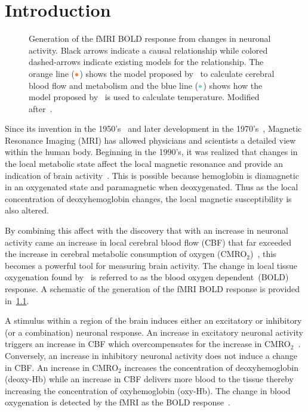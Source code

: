 \chapter{Introduction}
\label{ch:introduction}

\begin{figure}[tb]
  \centering
  \vspace{10pt}
  
  \caption[Generation of the fMRI BOLD response and a corresponding temperature change]{\label{fig:flowchart} Generation of the fMRI BOLD response from changes in neuronal activity.  Black arrows indicate a causal relationship while colored dashed-arrows indicate existing models for the relationship.  The orange line ($\color{goldfish}\bullet$) shows the model proposed by~\citet{sotero2011} to calculate cerebral blood flow and metabolism and the blue line ($\color{aoi}\bullet$) shows how the model proposed by~\citet{collins} is used to calculate temperature.  Modified after~\citet{sotero2007}.}
\end{figure}

Since its invention in the 1950's~\citep{carr1954} and later development in the 1970's~\citep{lauterbur1973}, {M}agnetic {R}esonance {I}maging ({MRI}) has allowed physicians and scientists a detailed view within the human body.  Beginning in the 1990's, it was realized that changes in the local metabolic state affect the local magnetic resonance and provide an indication of brain activity~\citep{ogawa1990,kwong1992}.  This is possible because hemoglobin is diamagnetic in an oxygenated state and paramagnetic when deoxygenated.  Thus as the local concentration of deoxyhemoglobin changes, the local magnetic susceptibility is also altered.  

By combining this affect with the discovery that with an increase in neuronal activity came an increase in local cerebral blood flow (CBF) that far exceeded the increase in cerebral metabolic consumption of oxygen (CMRO$_2$)~\citet{fox1986}, this becomes a powerful tool for measuring brain activity.  The change in local tissue oxygenation found by~\citet{fox1986} is referred to as the blood oxygen dependent~(BOLD) response.  A schematic of the generation of the fMRI BOLD response is provided in~\cref{fig:flowchart}.

A stimulus within a region of the brain induces either an excitatory or inhibitory (or a combination) neuronal response.  An increase in excitatory neuronal activity triggers an increase in CBF which overcompensates for the increase in CMRO$_2$~\citep{fox1986}.  Conversely, an increase in inhibitory neuronal activity does not induce a change in CBF.  An increase in CMRO$_2$ increases the concentration of deoxyhemoglobin (deoxy-Hb) while an increase in CBF delivers more blood to the tissue thereby increasing the concentration of oxyhemoglobin (oxy-Hb).  The change in blood oxygenation is detected by the fMRI as the BOLD response~\citep{kwong1992}.

